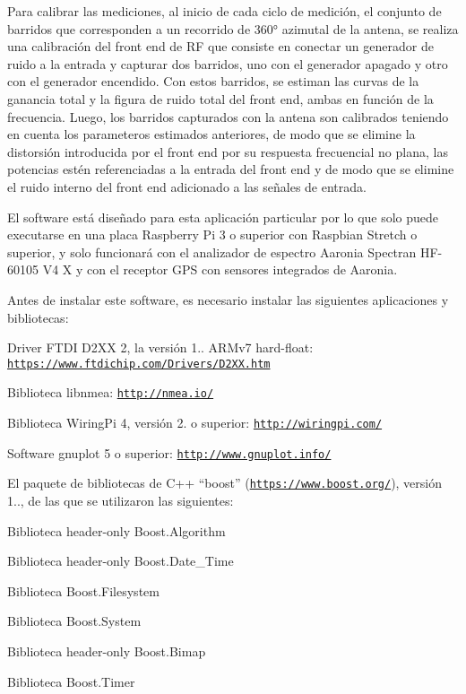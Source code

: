 Para calibrar las mediciones, al inicio de cada ciclo de medición, el conjunto de barridos que corresponden a un recorrido de 360° azimutal de la antena, se realiza una calibración del front end de RF que consiste en conectar un generador de ruido a la entrada y capturar dos barridos, uno con el generador apagado y otro con el generador encendido. Con estos barridos, se estiman las curvas de la ganancia total y la figura de ruido total del front end, ambas en función de la frecuencia. Luego, los barridos capturados con la antena son calibrados teniendo en cuenta los parameteros estimados anteriores, de modo que se elimine la distorsión introducida por el front end por su respuesta frecuencial no plana, las potencias estén referenciadas a la entrada del front end y de modo que se elimine el ruido interno del front end adicionado a las señales de entrada.

El software está diseñado para esta aplicación particular por lo que solo puede executarse en una placa Raspberry Pi 3 o superior con Raspbian Stretch o superior, y solo funcionará con el analizador de espectro Aaronia Spectran H\+F-\/60105 V4 X y con el receptor G\+PS con sensores integrados de Aaronia.

Antes de instalar este software, es necesario instalar las siguientes aplicaciones y bibliotecas\+:


\begin{DoxyItemize}
\item Driver F\+T\+DI D2\+XX 2, la versión 1.. A\+R\+Mv7 hard-\/float\+: \href{https://www.ftdichip.com/Drivers/D2XX.htm}{\tt https\+://www.\+ftdichip.\+com/\+Drivers/\+D2\+X\+X.\+htm}
\item Biblioteca libnmea\+: \href{http://nmea.io/}{\tt http\+://nmea.\+io/}
\item Biblioteca Wiring\+Pi 4, versión 2. o superior\+: \href{http://wiringpi.com/}{\tt http\+://wiringpi.\+com/}
\item Software gnuplot 5 o superior\+: \href{http://www.gnuplot.info/}{\tt http\+://www.\+gnuplot.\+info/}
\item El paquete de bibliotecas de C++ “boost” (\href{https://www.boost.org/}{\tt https\+://www.\+boost.\+org/}), versión 1.., de las que se utilizaron las siguientes\+:
\begin{DoxyItemize}
\item Biblioteca header-\/only Boost.\+Algorithm
\item Biblioteca header-\/only Boost.\+Date\+\_\+\+Time
\item Biblioteca Boost.\+Filesystem
\item Biblioteca Boost.\+System
\item Biblioteca header-\/only Boost.\+Bimap
\item Biblioteca Boost.\+Timer
\end{DoxyItemize}
\end{DoxyItemize}

